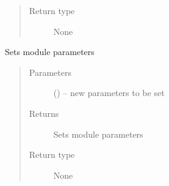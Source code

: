 \documentclass[letterpaper,10pt,english]{sphinxmanual}
\begin{document}
\begin{fulllineitems}
\begin{fulllineitems}
\begin{quote}
\begin{description}
\item[{Return type}] \leavevmode
None

\end{description}\end{quote}

\end{fulllineitems}


\begin{fulllineitems}
\label{\detokenize{MouseReferenceManual:Modules.Module_UDEC.Module_UDEC.setParameters}}
Sets module parameters
\begin{quote}\begin{description}
\item[{Parameters}] \leavevmode
{} () -- new parameters to be set

\item[{Returns}] \leavevmode
Sets module parameters

\item[{Return type}] \leavevmode
None

\end{description}\end{quote}

\end{fulllineitems}


\end{fulllineitems}

\end{document}
